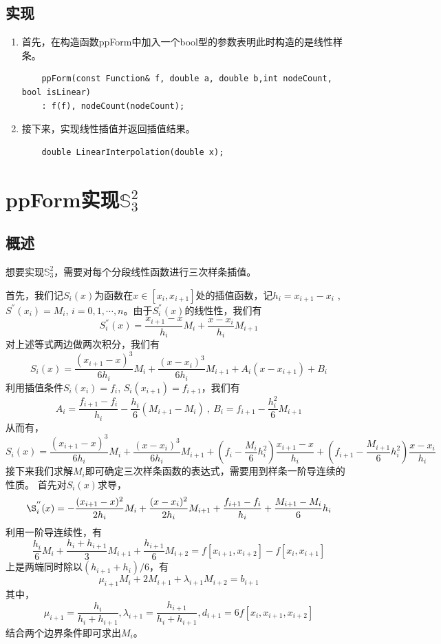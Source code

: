 \documentclass[UTF8]{ctexart}
\begin{document}
\subsection*{实现}
\begin{enumerate}
    \item 首先，在构造函数ppForm中加入一个bool型的参数表明此时构造的是线性样条。
    \begin{lstlisting}
    ppForm(const Function& f, double a, double b,int nodeCount, bool isLinear)
    : f(f), nodeCount(nodeCount);
    \end{lstlisting}
    \item 接下来，实现线性插值并返回插值结果。
    \begin{lstlisting}
    double LinearInterpolation(double x);
    \end{lstlisting}
\end{enumerate}

\section*{ppForm实现$\mathbb{S}_{3}^{2} $}
\subsection*{概述}
    想要实现$\mathbb{S}_{3}^{2} $，需要对每个分段线性函数进行三次样条插值。

    首先，我们记$S_{i}(x)$为函数在$x\in[x_{i},x_{i+1}]$处的插值函数，记$h_{i} = x_{i+1}-x_{i}$
    ,$S^{''}(x_{i}) = M_{i}$, $i = 0, 1,\cdots, n$。由于$S_{i}^{''}(x)$的线性性，我们有
    $$S_{i}^{''}(x) = \frac{x_{i+1} - x}{h_{i}} M_{i} + \frac{x - x_{i}}{h_{i}} M_{i+1}$$
    对上述等式两边做两次积分，我们有
    $$S_{i}(x) = \frac{(x_{i+1} - x)^{3}}{6h_{i}} M_{i} + \frac{(x - x_{i})^{3}}{6h_{i}} M_{i+1} +
        A_{i}(x - x_{i+1}) + B_{i}$$
    利用插值条件$S_{i}(x_{i}) = f_{i}$, $S_{i}(x_{i+1}) = f_{i+1}$，我们有
    $$A_{i} = \frac{f_{i+1} - f_{i}}{h_{i}} - \frac{h_{i}}{6}(M_{i+1} - M_{i})
        \ ,\ B_{i} = f_{i+1} - \frac{h_{i}^{2}}{6}M_{i+1}$$
    从而有，
    $$S_{i}(x) = \frac{(x_{i+1} - x)^{3}}{6h_{i}} M_{i} + \frac{(x - x_{i})^{3}}{6h_{i}} M_{i+1}
                + (f_{i} - \frac{M_{i}}{6}h_{i}^{2}) \frac{x_{i+1} - x}{h_{i}}
                + (f_{i+1} - \frac{M_{i+1}}{6}h_{i}^{2}) \frac{x - x_{i}}{h_{i}}$$
    接下来我们求解$M_{i}$即可确定三次样条函数的表达式，需要用到样条一阶导连续的性质。
    首先对$S_{i}(x)$求导，
    $$\S_{i}^{''}(x) = - \frac{(x_{i+1} - x)^{2}}{2h_{i}} M_{i} + \frac{(x - x_{i})^{2}}{2h_{i}} M_{i+1} 
                       + \frac{f_{i+1} - f_{i}}{h_{i}} + \frac{M_{i+1} - M_{i}}{6} h_{i} $$
    利用一阶导连续性，有
    $$\frac{h_{i}}{6}M_{i} + \frac{h_{i} + h_{i+1}}{3}M_{i+1} + \frac{h_{i+1}}{6}M_{i+2}
        = f[x_{i+1}, x_{i+2}] - f[x_{i}, x_{i+1}] $$
    上是两端同时除以$(h_{i+1}+h_{i})/6$，有
    $$\mu_{i+1}M_{i} + 2M_{i+1} + \lambda_{i+1}M_{i+2} = b_{i+1}$$
    其中，
    $$\mu_{i+1} = \frac{h_{i}}{h_{i} + h_{i+1}}, \lambda_{i+1} = \frac{h_{i+1}}{h_{i} + h_{i+1}}, 
        d_{i+1} = 6f[x_{i}, x_{i+1}, x_{i+2}]$$
    结合两个边界条件即可求出$M_{i}$。
\end{document}
